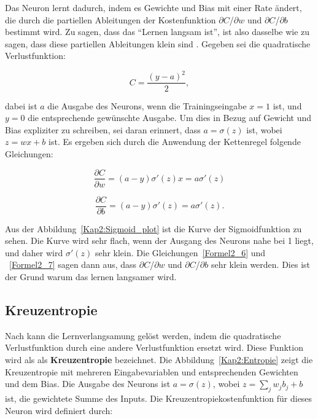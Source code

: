         Das Neuron lernt dadurch, indem es Gewichte und Bias mit einer Rate ändert, die durch die partiellen Ableitungen der Kostenfunktion $\partial$$C$/$\partial$$w$ und $\partial$$C$/$\partial$$b$ bestimmt wird. Zu sagen, dass das \enquote{Lernen langsam ist}, ist also dasselbe wie zu sagen, dass diese partiellen Ableitungen klein sind \cite*[61]{Nielsen2015}. Gegeben sei die quadratische Verlustfunktion:

        \begin{equation} \label{Formel2_5}
            C=\frac{( y-a)^{2}}{2},
        \end{equation}

        dabei ist $a$ die Ausgabe des Neurons, wenn die Trainingseingabe $x = 1$ ist, und $y = 0$ die entsprechende gewünschte Ausgabe. Um dies in Bezug auf Gewicht und Bias expliziter zu schreiben, sei daran erinnert, dass $a = \sigma(z)$ ist, wobei $z = wx + b$ ist. Es ergeben sich durch die Anwendung der Kettenregel folgende Gleichungen:

        \begin{equation} \label{Formel2_6}
            \frac{\partial C}{\partial w} =( a-y) \sigma '( z) x=a\sigma '( z)
        \end{equation}

        \begin{equation} \label{Formel2_7}
            \frac{\partial C}{\partial b} =( a-y) \sigma '( z) =a\sigma '( z).
        \end{equation}

        Aus der Abbildung~\ref{Kap2:Sigmoid_plot} ist die Kurve der Sigmoidfunktion zu sehen. Die Kurve wird sehr flach, wenn der Ausgang des Neurons nahe bei 1 liegt, und daher wird $\sigma'(z)$ sehr klein. Die Gleichungen~\ref{Formel2_6} und ~\ref{Formel2_7} sagen dann aus, dass $\partial$$C$/$\partial$$w$  und  $\partial$$C$/$\partial$$b$ sehr klein werden. Dies ist der Grund warum das lernen langsamer wird.

    \subsection{Kreuzentropie}
    Nach \cite*[62]{Nielsen2015} kann die Lernverlangsamung gelöst werden, indem die quadratische Verlustfunktion durch eine andere Verlustfunktion ersetzt wird. Diese Funktion wird als als \textbf{Kreuzentropie} bezeichnet. Die Abbildung~\ref{Kap2:Entropie} zeigt die Kreuzentropie mit mehreren Eingabevariablen und entsprechenden Gewichten und dem Bias. Die Ausgabe des Neurons ist $a = \sigma(z)$, wobei $z =  \sum _{j} w_{j} b_{j} + b$ ist, die gewichtete Summe des Inputs. Die Kreuzentropiekostenfunktion für dieses Neuron wird definiert durch:

